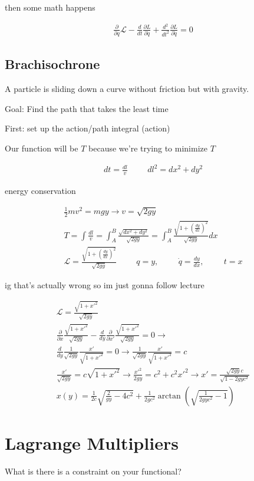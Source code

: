 \documentclass[fleqn]{report}
\newcommand{\hp}{\hspace{1cm}}
\newcommand{\del}{\partial}
\newcommand{\equations} [1] {
\begin{gather*}
#1
\end{gather*}
}
\begin{document}
then some math happens 
\equations{
    \frac{\del}{\del q} \mathcal L - \frac{d}{dt} \frac{\del L}{\del \dot q} + 
    \frac{d^2}{dt^2} \frac{\del L}{\del \ddot q} 
    = 0
}

\subsection{Brachisochrone}
A particle is sliding down a curve without friction but with gravity. 

Goal: Find the path that takes the least time 

First: set up the action/path integral (action)

Our function will be $T$ because we're trying to minimize $T$

\equations{
    dt = \frac{dl}{v} \hp dl^2 = dx^2 + dy^2
}
energy conservation 
\equations{
    \frac{1}{2} mv^2 = mgy \rightarrow 
    v = \sqrt{2gy}
    \\
    T
    =
    \int \frac{dl}{v} = 
    \int^B_A \frac{\sqrt{dx^2 + dy^2}}{\sqrt{2gy}}
    =
    \int^B_A \frac{\sqrt{1 + (\frac{dy}{dx})^2}}{\sqrt{2gy}} dx
    \\
    \mathcal L = \frac{\sqrt{1 + (\frac{dy}{dx})^2}}{\sqrt{2gy}}
    \hp 
    q = y, \hp \dot q = \frac{dy}{dx}, \hp t = x
}
ig that's actually wrong so im just gonna follow lecture 

\equations{
    \mathcal L =  
    \frac{\sqrt{1 + x'^2}}{\sqrt{2gy}}
    \\
    \frac{\del}{\del x}
    \frac{\sqrt{1 + x'^2}}{\sqrt{2gy}}
    -
    \frac{d}{dy}
    \frac{\del}{\del x'}
    \frac{\sqrt{1 + x'^2}}{\sqrt{2gy}}
    = 0
    \rightarrow 
    \\
    \frac{d}{dy}
    \frac{1}{\sqrt{2gy}} \frac{x'}{\sqrt{1 + x'^2}}
    = 0
    \rightarrow
    \frac{1}{\sqrt{2gy}} \frac{x'}{\sqrt{1 + x'^2}}
    = c
    \\
    \frac{x'}{\sqrt{2gy}}
    = c\sqrt{1 + x'^2}
    \rightarrow
    \frac{x'^2}{2gy}
    = c^2 + c^2 x'^2
    \rightarrow 
    x' = \frac{\sqrt{2gy} c}{\sqrt{1 - 2gy c^2}}
    \\
    x(y) = \frac{1}{2c} \sqrt{\frac{2}{gy} - 4c^2}
    +
    \frac{1}{2gc^2} \arctan(\sqrt{\frac{1}{2gyc^2} - 1})
}

\section{Lagrange Multipliers}
What is there is a constraint on your functional?
\end{document}
